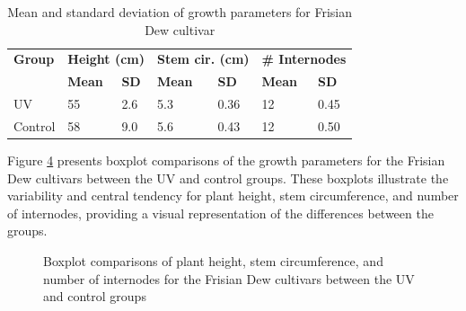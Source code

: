 \begin{table}[htbp]
    \caption[Mean and standard deviation of growth parameters]{Mean and standard deviation of growth parameters for Frisian Dew cultivar}
    \label{tab:descriptive_statistics}
    \begin{tabularx}{\linewidth}{l|XX|XX|XX}
        \toprule
        \textbf{Group} & \multicolumn{2}{l|}{\textbf{Height (\unit[mode=text]{\cm})}} & \multicolumn{2}{l|}{\textbf{Stem cir. (\unit[mode=text]{\cm})}} & \multicolumn{2}{l}{\textbf{\# Internodes}} \\
        & \textbf{Mean} & \textbf{SD} & \textbf{Mean} & \textbf{SD} & \textbf{Mean} & \textbf{SD} \\
        \midrule
        UV & \num[mode=text]{55} & \num[mode=text]{2.6} & \num[mode=text]{5.3} & \num[mode=text]{0.36} & \num[mode=text]{12} & \num[mode=text]{0.45} \\
        Control & \num[mode=text]{58} & \num[mode=text]{9.0} & \num[mode=text]{5.6} & \num[mode=text]{0.43} & \num[mode=text]{12} & \num[mode=text]{0.50} \\
        \bottomrule
    \end{tabularx}
\end{table}

Figure \ref{fig:boxplot_comparisons_growth_parameters} presents boxplot comparisons of the growth parameters for the Frisian Dew cultivars between the UV and control groups. These boxplots illustrate the variability and central tendency for plant height, stem circumference, and number of internodes, providing a visual representation of the differences between the groups.

\begin{figure}[htbp]
    \begin{subfigure}[t]{.32\textwidth}
        
        \label{fig:boxplot_comparison_height}
    \end{subfigure}
    \begin{subfigure}[t]{.32\textwidth}
        
        \label{fig:boxplot_comparison_stem-circumference}
    \end{subfigure}
    \begin{subfigure}[t]{.32\textwidth}
        
        \label{fig:boxplot_comparison_no-internodes}
    \end{subfigure}
    \caption[Comparison of growth parameters for Frisian Dew cultivars]{Boxplot comparisons of plant height, stem circumference, and number of internodes for the Frisian Dew cultivars between the UV and control groups}
    \label{fig:boxplot_comparisons_growth_parameters}
\end{figure}

